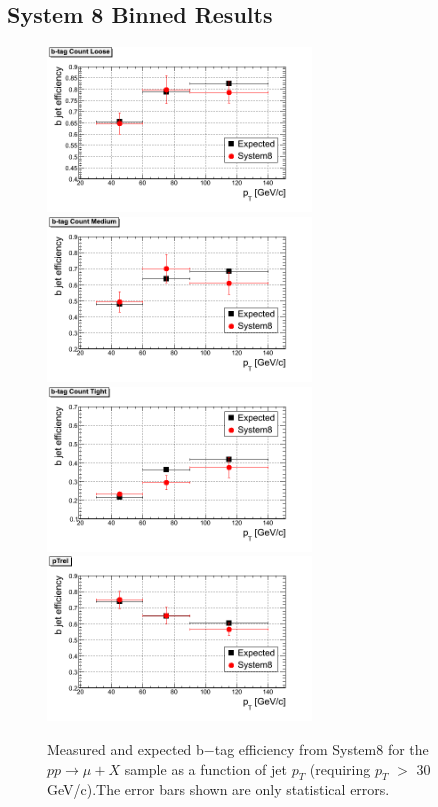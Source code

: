 \subsection{System 8 Binned Results}
\begin{figure}[htbp]
  \begin{center}
    \includegraphics[width=70mm]{Figures/TCL_Tag.png}
    \includegraphics[width=70mm]{Figures/TCM_Tag.png}
    \includegraphics[width=70mm]{Figures/TCT_Tag.png}
    \includegraphics[width=70mm]{Figures/pTrel.png}
  \end{center}
  \caption{Measured and expected b$-$tag efficiency from System8 for the 
$pp\rightarrow \mu+ X$ sample as a function of jet $p_T $ 
(requiring $p_T $ $> $ 30 GeV/c).The error bars shown are only statistical 
errors.}
  \label{fig:S8_TC_results}
\end{figure}
\vspace{-5cm}

